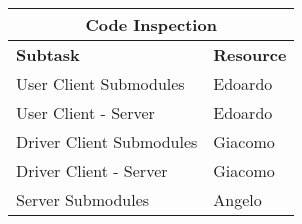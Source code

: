 \vspace* {30px}

\begin{center}
\begin{tabular}{ |l|l| }
	\multicolumn{2}{c}{\textbf{Code Inspection}} \\ \hline
	\textbf{Subtask} & \textbf{Resource} \\ \hline
	\multirow{1}{*}{User Client Submodules} & Edoardo \\ \hline
	\multirow{1}{*}{User Client - Server} & Edoardo \\ \hline
	\multirow{1}{*}{Driver Client Submodules} & Giacomo \\ \hline
	\multirow{1}{*}{Driver Client - Server} & Giacomo \\ \hline
	\multirow{1}{*}{Server Submodules} & Angelo \\ \hline

\end{tabular}
\end{center}